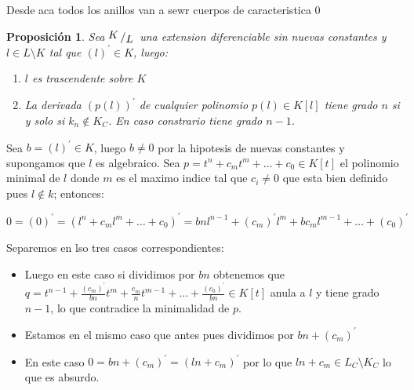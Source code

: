 \documentclass[11pt]{article}
\newcommand{\quotient}[2]{{\raisebox{.2em}{$#1$}\left/\raisebox{-.2em}{$#2$}\right.}}
\newcommand{\derivation}[1]{\left(#1\right)^\prime}
\newcommand{\constants}[1]{#1_C}
\numberwithin{theorem}{subsection}
\newtheorem{proposition}[theorem]{Proposici\'on}
\newenvironment{proof}[1][Demostraci\'on]{\begin{trivlist}
		\item[\hskip \labelsep {\bfseries #1}]}{\end{trivlist}}
\newcommand{\qed}{\nobreak \ifvmode \relax \else
	\ifdim\lastskip<1.5em \hskip-\lastskip
	\hskip1.5em plus0em minus0.5em \fi \nobreak
	\vrule height0.75em width0.5em depth0.25em\fi}
\begin{document}
Desde aca todos los anillos van a sewr cuerpos de caracteristica 0

\begin{proposition}
	Sea $\quotient{K}{L}$ una extension diferenciable sin nuevas constantes y $l \in L \setminus K$ tal que $\derivation{l} \in K$, luego:
	
	\begin{enumerate}
		\item $l$ es trascendente sobre $K$
		\item La derivada $\derivation{p(l)}$ de cualquier polinomio $p(l) \in K[l]$ tiene grado $n$ si y solo si $k_n \not \in \constants{K}$. En caso constrario tiene grado $n-1$.
	\end{enumerate}
	
\end{proposition}

\begin{proof}
	Sea $b = \derivation{l} \in K$, luego $b \neq 0$ por la hipotesis de nuevas constantes y supongamos que $l$ es algebraico. Sea $p = t^n + c_m t^m + \dots + c_0 \in K[t]$ el polinomio minimal de $l$ donde $m$ es el maximo indice tal que $c_i \neq 0$ que esta bien definido pues $l \not \in k$; entonces:
	
	\begin{equation}
	0 = \derivation{0} = \derivation{l^n + c_ml^m + \dots + c_0} = bnl^{n-1} + \derivation{c_m}l^m + bc_ml^{m-1} + \dots + \derivation{c_0}
	\end{equation}
	
	Separemos en lso tres casos correspondientes:
	
	\begin{itemize}
		\item[$n-1 > m$]
		
		Luego en este caso si dividimos por $bn$ obtenemos que $q = t^{n-1} + \frac{\derivation{c_m}}{bn} t^m + \frac{c_m}{n} t^{m-1} + \dots + \frac{\derivation{c_0}}{bn} \in K[t]$ anula a $l$ y tiene grado $n-1$, lo que contradice la minimalidad de $p$.
		
		\item[$n-1=m$ y $bn + \derivation{c_m} \neq 0$]
		
		Estamos en el mismo caso que antes pues dividimos por $bn + \derivation{c_m}$
		
		\item [$n-1=m$ y $bn + \derivation{c_m} = 0$]
		
		En este caso $0 = bn + \derivation{c_m} = \derivation{ln + c_m}$ por lo que  $ln + c_m \in \constants{L} \setminus \constants{K}$ lo que es absurdo. \qed
		
	\end{itemize}
	
	
\end{proof}
\end{document}
